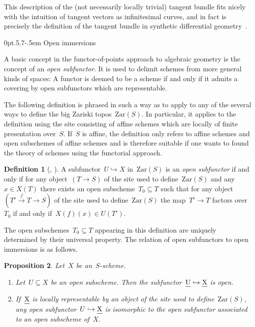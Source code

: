 \documentclass[10pt,reqno,a4paper]{amsbook}
\makeatletter
\theoremstyle{definition}
\newtheorem{defn}{Definition}[section]
\theoremstyle{plain}
\newtheorem{prop}[defn]{Proposition}
\theoremstyle{remark}
\let\oldul\ul
\renewcommand{\ul}[1]{\text{\oldul{$#1$}}}
\newcommand{\Zar}{\mathrm{Zar}}
\newcommand{\?}{\,{:}\,}
\renewcommand{\_}{\mathpunct{.}\,}
\newcommand{\xra}{\xrightarrow}
\def\subsection{\@startsection{subsection}{2}%
  {0pt}{.5\linespacing\@plus.7\linespacing}{-.5em}%
  {\normalfont\bfseries}}
\makeatother
\begin{document}
This description of the (not necessarily
locally trivial) tangent bundle fits nicely with the intuition of tangent
vectors as infinitesimal curves, and in fact is precisely the definition of the
tangent bundle in synthetic differential geometry~\cite[Def.~7.1]{kock:sdg}.


\subsection{Open immersions}

A basic concept in the functor-of-points approach to algebraic geometry is the
concept of an \emph{open subfunctor}. It is used to delimit schemes from more
general kinds of spaces: A functor is deemed to be a scheme if and only if it
admits a covering by open subfunctors which are representable.

The following definition is phrased in such a way as to apply to any of the
several ways to define the big Zariski topos~$\Zar(S)$. In particular, it
applies to the definition using the site consisting of affine schemes which are
locally of finite presentation over~$S$. If~$S$ is affine, the definition only
refers to affine schemes and open subschemes of affine schemes and is therefore
suitable if one wants to found the theory of schemes using the functorial
approach.

\begin{defn}[{\cite[Définition~I.1.3.6 on page~10]{demazure:gabriel},
\cite[Tag~01JI]{stacks-project}}]
A subfunctor~$U \hookrightarrow X$ in~$\Zar(S)$ is an \emph{open subfunctor} if
and only if for any object~$(T \to S)$ of the site used to define~$\Zar(S)$
and any~$x \in X(T)$ there exists an open subscheme~$T_0 \subseteq T$
such that for any object~$(T' \xra{f} T \to S)$ of the site used to
define~$\Zar(S)$ the map~$T' \to T$ factors over~$T_0$ if and only if~$X(f)(x)
\in U(T')$.
\end{defn}

The open subschemes~$T_0 \subseteq T$ appearing in this definition are uniquely
determined by their universal property. The relation of open subfunctors to
open immersions is as follows.

\begin{prop}\label{prop:char-open-immersion}
Let~$X$ be an~$S$-scheme.
\begin{enumerate}
\item Let~$U \subseteq X$ be an open subscheme. Then the subfunctor~$\ul{U}
\hookrightarrow \ul{X}$ is open.
\item If~$\ul{X}$ is locally representable by an object of the site used to
define~$\Zar(S)$, any open subfunctor~$U \hookrightarrow \ul{X}$ is isomorphic
to the open subfunctor associated to an open subscheme of~$X$.
\end{enumerate}
\end{prop}
\end{document}

